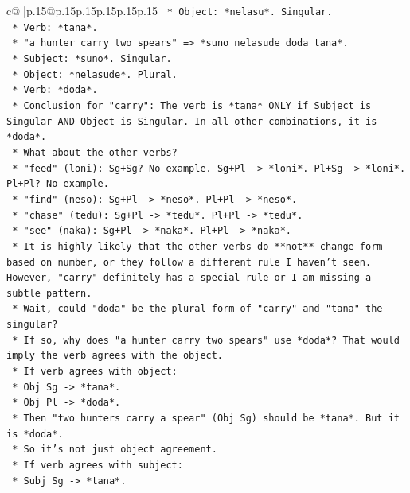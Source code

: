 \documentclass{article}
\begin{document}
{\begin{supertabular}{c@{$\;$}|p{.15\linewidth}@{}p{.15\linewidth}p{.15\linewidth}p{.15\linewidth}p{.15\linewidth}p{.15\linewidth}}
{{{\texttt{        *   Object: *nelasu*. Singular.} \\
\texttt{        *   Verb: *tana*.} \\
\texttt{    *   "a hunter carry two spears" => *suno nelasude doda tana*.} \\
\texttt{        *   Subject: *suno*. Singular.} \\
\texttt{        *   Object: *nelasude*. Plural.} \\
\texttt{        *   Verb: *doda*.} \\
\texttt{    *   Conclusion for "carry": The verb is *tana* ONLY if Subject is Singular AND Object is Singular. In all other combinations, it is *doda*.} \\
\texttt{    *   What about the other verbs?} \\
\texttt{        *   "feed" (loni): Sg+Sg? No example. Sg+Pl {-}> *loni*. Pl+Sg {-}> *loni*. Pl+Pl? No example.} \\
\texttt{        *   "find" (neso): Sg+Pl {-}> *neso*. Pl+Pl {-}> *neso*.} \\
\texttt{        *   "chase" (tedu): Sg+Pl {-}> *tedu*. Pl+Pl {-}> *tedu*.} \\
\texttt{        *   "see" (naka): Sg+Pl {-}> *naka*. Pl+Pl {-}> *naka*.} \\
\texttt{    *   It is highly likely that the other verbs do **not** change form based on number, or they follow a different rule I haven't seen. However, "carry" definitely has a special rule or I am missing a subtle pattern.} \\
\texttt{    *   Wait, could "doda" be the plural form of "carry" and "tana" the singular?} \\
\texttt{        *   If so, why does "a hunter carry two spears" use *doda*? That would imply the verb agrees with the object.} \\
\texttt{        *   If verb agrees with object:} \\
\texttt{            *   Obj Sg {-}> *tana*.} \\
\texttt{            *   Obj Pl {-}> *doda*.} \\
\texttt{            *   Then "two hunters carry a spear" (Obj Sg) should be *tana*. But it is *doda*.} \\
\texttt{            *   So it's not just object agreement.} \\
\texttt{        *   If verb agrees with subject:} \\
\texttt{            *   Subj Sg {-}> *tana*.} \\
}}}
\end{supertabular}}
\end{document}
